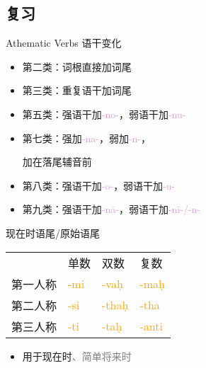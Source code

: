 \documentclass[17pt]{beamer}
\newcommand{\wordending}[1]{\textcolor{Orange}{\nobreakdash-#1}}
\newcommand{\pratyaya}[1]{\textcolor{Plum}{#1}}
\newcommand{\notsoimportant}[1]{\textcolor{gray}{#1}}
\begin{document}
\subsection{复习}
\begin{frame}{Athematic Verbs  语干变化}
  \small
  \raggedright
  \begin{itemize}
    \item 第二类：词根直接加词尾
    \item 第三类：重复语干加词尾
    \item 第五类：强语干加\pratyaya{\nobreakdash-no\nobreakdash-}，弱语干加\pratyaya{\nobreakdash-nu\nobreakdash-}
    \item 第七类：强加\pratyaya{\nobreakdash-na\nobreakdash-}，弱加\pratyaya{\nobreakdash-n\nobreakdash-}，
    
    \hspace*{4em}加在落尾辅音前
    \item 第八类：强语干加\pratyaya{\nobreakdash-o\nobreakdash-}，弱语干加\pratyaya{\nobreakdash-u\nobreakdash-}
    \item 第九类：强语干加\pratyaya{\nobreakdash-nā\nobreakdash-}，弱语干加\pratyaya{\nobreakdash-nī\nobreakdash-/\nobreakdash-n\nobreakdash-}
  \end{itemize}
\end{frame}

\begin{frame}{现在时语尾/原始语尾}
  \centering
  \begin{tabular}{@{}llll@{}} %
    & 单数  & 双数  & 复数 \\
    第一人称 & \wordending{mi} & \wordending{vaḥ}  & \wordending{maḥ}  \\
    第二人称 & \wordending{si} & \wordending{thaḥ} & \wordending{tha}  \\
    第三人称 & \wordending{ti} & \wordending{taḥ} & \cellcolor{green!20}\wordending{anti} \\
  \end{tabular} 
  \bigskip
  \begin{itemize}
    \item 用于现在时\notsoimportant{、简单将来时}
  \end{itemize}  
\end{frame}
\end{document}
